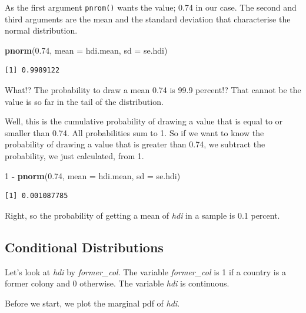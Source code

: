 \documentclass[]{book}
\newenvironment{Shaded}{\begin{snugshade}}{\end{snugshade}}
\newcommand{\KeywordTok}[1]{\textcolor[rgb]{0.13,0.29,0.53}{\textbf{#1}}}
\newcommand{\DataTypeTok}[1]{\textcolor[rgb]{0.13,0.29,0.53}{#1}}
\newcommand{\DecValTok}[1]{\textcolor[rgb]{0.00,0.00,0.81}{#1}}
\newcommand{\FloatTok}[1]{\textcolor[rgb]{0.00,0.00,0.81}{#1}}
\newcommand{\StringTok}[1]{\textcolor[rgb]{0.31,0.60,0.02}{#1}}
\newcommand{\OperatorTok}[1]{\textcolor[rgb]{0.81,0.36,0.00}{\textbf{#1}}}
\newcommand{\NormalTok}[1]{#1}
\theoremstyle{definition}
\theoremstyle{definition}
\theoremstyle{definition}
\theoremstyle{remark}
\begin{document}
As the first argument \texttt{pnrom()} wants the value; 0.74 in our
case. The second and third arguments are the mean and the standard
deviation that characterise the normal distribution.

\begin{Shaded}
\begin{Highlighting}[]
\KeywordTok{pnorm}\NormalTok{(}\FloatTok{0.74}\NormalTok{, }\DataTypeTok{mean =}\NormalTok{ hdi.mean, }\DataTypeTok{sd =}\NormalTok{ se.hdi)}
\end{Highlighting}
\end{Shaded}

\begin{verbatim}
[1] 0.9989122
\end{verbatim}

What!? The probability to draw a mean 0.74 is 99.9 percent!? That cannot
be the value is so far in the tail of the distribution.

Well, this is the cumulative probability of drawing a value that is
equal to or smaller than 0.74. All probabilities sum to 1. So if we want
to know the probability of drawing a value that is greater than 0.74, we
subtract the probability, we just calculated, from 1.

\begin{Shaded}
\begin{Highlighting}[]
\DecValTok{1} \OperatorTok{-}\StringTok{ }\KeywordTok{pnorm}\NormalTok{(}\FloatTok{0.74}\NormalTok{, }\DataTypeTok{mean =}\NormalTok{ hdi.mean, }\DataTypeTok{sd =}\NormalTok{ se.hdi)}
\end{Highlighting}
\end{Shaded}

\begin{verbatim}
[1] 0.001087785
\end{verbatim}

Right, so the probability of getting a mean of \emph{hdi} in a sample is
0.1 percent.

\subsection{Conditional Distributions}\label{conditional-distributions}

Let's look at \emph{hdi} by \emph{former\_col}. The variable
\emph{former\_col} is 1 if a country is a former colony and 0 otherwise.
The variable \emph{hdi} is continuous.

Before we start, we plot the marginal pdf of \emph{hdi}.
\end{document}
